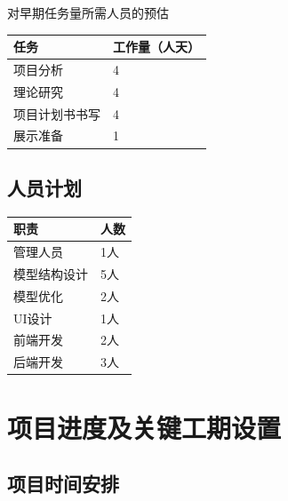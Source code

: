 \documentclass[hyperref, a4paper]{ctexart}
\begin{document}
对早期任务量所需人员的预估

\begin{longtable}[]{@{}ll@{}}
\toprule
任务 & 工作量（人天）\tabularnewline
\midrule
\endhead
项目分析 & 4\tabularnewline
理论研究 & 4\tabularnewline
项目计划书书写 & 4\tabularnewline
展示准备 & 1\tabularnewline
\bottomrule
\end{longtable}

\hypertarget{ux4ebaux5458ux8ba1ux5212}{%
\subsection{人员计划}\label{ux4ebaux5458ux8ba1ux5212}}

\begin{longtable}[]{@{}ll@{}}
\toprule
职责 & 人数\tabularnewline
\midrule
\endhead
管理人员 & 1人\tabularnewline
模型结构设计 & 5人\tabularnewline
模型优化 & 2人\tabularnewline
UI设计 & 1人\tabularnewline
前端开发 & 2人\tabularnewline
后端开发 & 3人\tabularnewline
\bottomrule
\end{longtable}

\hypertarget{ux9879ux76eeux8fdbux5ea6ux53caux5173ux952eux5de5ux671fux8bbeux7f6e}{%
\section{项目进度及关键工期设置}\label{ux9879ux76eeux8fdbux5ea6ux53caux5173ux952eux5de5ux671fux8bbeux7f6e}}

\hypertarget{ux9879ux76eeux65f6ux95f4ux5b89ux6392}{%
\subsection{项目时间安排}\label{ux9879ux76eeux65f6ux95f4ux5b89ux6392}}
\end{document}
